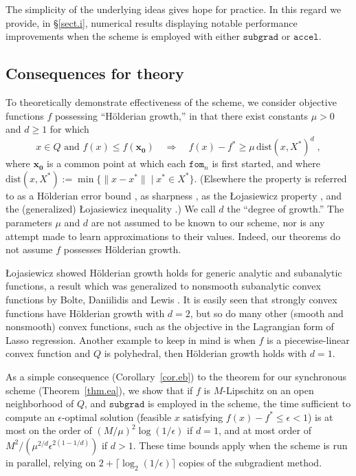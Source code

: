 \documentclass[reqno, 11pt]{amsart}
\numberwithin{equation}{section}
\newcommand{\fom}{\mathtt{fom}}
\newcommand{\subgrad}{\mathtt{subgrad}}
\newcommand{\dist}{\mathrm{dist}}
\begin{document}
The simplicity of the underlying ideas gives hope for practice. In this regard we provide, in \S\ref{sect.i}, numerical results displaying notable performance improvements when the scheme is employed with either $\mathtt{subgrad}$ or $\mathtt{accel}$. 

\subsection{Consequences for theory} \label{sect.ad}

To theoretically demonstrate effectiveness of the scheme, we consider objective functions $ f $ possessing ``H\"{o}lderian growth,'' in that there exist constants $ \mu > 0 $ and $ d \geq 1 $ for which
\[ 
   x \in Q \textrm{ and } f(x) \leq f( \mathbf{x_0})  \quad \Rightarrow \quad f(x) - f^* \geq \mu \,  \dist(x,X^*)^d \; , 
\] 
where $ \mathbf{x_0} $ is a common point at which each $ \fom_n $ is first started, and where $ \dist(x,X^*) := \min \{ \| x - x^* \| \mid x^* \in X^* \} $. (Elsewhere the property is referred to as a H\"{o}lderian error bound \cite{yang2017adaptive}, as  sharpness \cite{roulet2017sharpness}, as the {\L}ojasiewicz property \cite{karimi2016linear}, and the (generalized) {\L}ojasiewicz inequality  \cite{bolte2007lojasiewicz}.)  We call $ d $ the ``degree of growth.'' The parameters $ \mu $ and $ d $ are not assumed to be known to our scheme, nor is any attempt made to learn approximations to their values. Indeed, our theorems do not assume $ f $ possesses H\"{o}lderian growth.

{\L}ojasiewicz \cite{lojasiewicz1963propriete, lojasiewicz1993geometrie} showed H\"{o}lderian growth holds for generic analytic and subanalytic functions, a result which was generalized to nonsmooth subanalytic convex functions by Bolte, Daniilidis and Lewis \cite{bolte2007lojasiewicz}.  It is easily seen that strongly convex functions have H\"{o}lderian growth with $ d = 2 $, but so do many other (smooth and nonsmooth) convex functions, such as the objective in the Lagrangian form of Lasso regression. Another example to keep in mind is when $ f $ is a piecewise-linear convex function and $ Q $ is polyhedral, then H\"{o}lderian growth holds with $ d = 1 $.

As a simple consequence (Corollary~\ref{cor.eb}) to the theorem for our synchronous scheme (Theorem~\ref{thm.ea}), we show that if $ f $ is $ M $-Lipschitz on an open neighborhood of $ Q $, and $ \subgrad $  is employed in the scheme, the time sufficient to compute an $ \epsilon $-optimal solution (feasible $ x $ satisfying $ f(x) - f^* \leq \epsilon < 1 $) is at most on the order of $ (M/ \mu)^2 \log(1/ \epsilon) $ if $ d = 1 $, and at most order of $ M^2/(\mu^{2/d} \epsilon^{2(1 - 1/d)}) $ if $ d > 1 $. These time bounds apply when the scheme is run in parallel, relying on $ 2 + \lceil \log_2( 1/ \epsilon) \rceil  $ copies of the subgradient method. 
\end{document}

